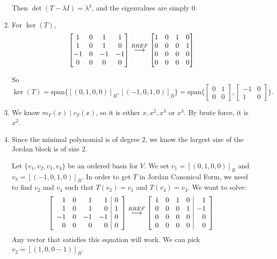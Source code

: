 \documentclass{article}
\newcommand{\grstep}[2][\relax]{%
   \ensuremath{\mathrel{
       {\mathop{\longrightarrow}\limits^{#2\mathstrut}_{
                                     \begin{subarray}{l} #1 \end{subarray}}}}}}
\begin{document}
\begin{enumerate}[label=(\alph*)]
    Then $\det(T-\lambda I)=\lambda^4$, and the eigenvalues are simply $0$.
    \item For $\ker(T)$, 
    \begin{equation*}
    \begin{bmatrix} 
        1 & 0 & 1 & 1\\
        1 & 0 & 1 & 0\\
        -1 & 0 & -1 & -1 \\
        0 & 0 & 0 & 0
        \end{bmatrix} \grstep[]{RREF} \begin{bmatrix} 
        1 & 0 & 1 & 0 \\
        0 & 0 & 0 & 1 \\
        0 & 0 & 0 & 0 \\
        0 & 0 & 0 & 0
        \end{bmatrix}
    \end{equation*}
        
    So $\ker(T)=\text{span}\{[(0,1,0,0)]_B, [(-1,0,1,0)]_B\}=\text{span}\Bigg\{\left[\begin{array}{rr}
    0 & 1 \\
    0 & 0
    \end{array}\right], \left[\begin{array}{rr}
    -1 & 0 \\
    1 & 0
    \end{array}\right]\Bigg\}.$ 
    \item  We know $m_T(x) \mid c_T(x)$, so it is either $x, x^2, x^3$ or $x^4$. By brute force, it is $x^2$.
    \item Since the minimal polynomial is of degree 2, we know the largest size of the Jordan block is of size 2. 
    
    Let $\{v_1, v_2, v_3, v_4\}$ be an ordered basis for $V$. We set $v_1=[(0,1,0,0)]_B$ and $v_3=[(-1,0,1,0)]_B$. In order to get $T$ in Jordan Canonical Form, we need to find $v_2$ and $v_4$ such that $T(v_2)=v_1$ and $T(v_4)=v_3$. We want to solve:
    \begin{equation*}
        \left[\begin{array}{rrrr|r}
    1 & 0 & 1 & 1 & 0 \\
    1 & 0 & 1 & 0 & 1 \\
    -1 & 0 & -1 & -1 & 0 \\
    0 & 0 & 0 & 0 & 0
    \end{array}\right] \grstep[]{RREF} \left[\begin{array}{rrrr|r}
    1 & 0 & 1 & 0 & 1 \\
    0 & 0 & 0 & 1 & -1 \\
    0 & 0 & 0 & 0 & 0 \\
    0 & 0 & 0 & 0 & 0
    \end{array}\right] 
    \end{equation*}
    Any vector that satisfies this equation will work. We can pick $v_2=[(1,0,0-1)]_B$.
    

\end{enumerate}
\end{document}
